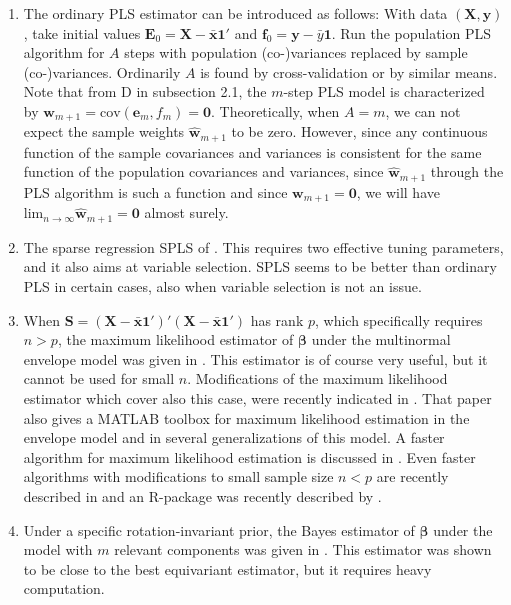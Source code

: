 \documentclass[num-refs]{wiley-article}
\begin{document}
\begin{enumerate}[label=\alph*.]

\item The ordinary PLS estimator can be introduced as follows: With data $(\bm{X},\bm{y})$, take initial values $\bm{E}_{0}=\bm{X}-\bar{\bm{x}}\bm{1}'$
  and $\bm{f}_{0}=\bm{y}-\bar{y}\bm{1}$. Run the population PLS algorithm for $A$ steps with population (co-)variances replaced by sample (co-)variances.
  Ordinarily $A$ is found by cross-validation or by similar means. Note that from D in subsection 2.1, the $m$-step PLS model is characterized by $\bm{w}_{m+1}=\mathrm{cov}(\bm{e}_m,f_m)=\bm{0}$. Theoretically, when $A=m$, we can not expect the sample weights $\widehat{\bm{w}}_{m+1}$
  to be zero. However, since any continuous function of the sample covariances and variances is consistent for the same function of the
  population covariances and variances, since  $\widehat{\bm{w}}_{m+1}$ through the PLS algorithm is such a function and since $\bm{w}_{m+1}=\bm{0}$, we will have ${\mathrm{lim}_{n\rightarrow\infty}}\widehat{\bm{w}}_{m+1}=\bm{0}$ almost surely.
  \smallskip

\item The sparse regression SPLS of \citet{chun2010sparse}. This requires two effective tuning parameters, and it also aims at variable selection. SPLS seems to be better than ordinary PLS in certain cases, also when variable selection is not an issue.
  \smallskip

\item When $\bm{S}=(\bm{X}-\bar{\bm{x}}\bm{1}')'(\bm{X}-\bar{\bm{x}}\bm{1}')$ has rank $p$, which specifically requires $n>p$, the maximum likelihood
  estimator of $\bm{\beta}$ under the multinormal envelope model was given in \citet{cook2013envelopes}. This estimator is of course very useful, but it cannot be used for small $n$. Modifications of the maximum likelihood estimator which cover also this case, were recently indicated in \citet{cook2015envlp}. That paper also gives a MATLAB toolbox for maximum likelihood estimation in the envelope model and in several generalizations of this model. A faster algorithm for maximum likelihood estimation is discussed in \citet{cook2016algorithms}. Even faster algorithms with modifications to small sample size $n<p$ are recently described in \citet{CookZhang2017} and an R-package was recently described by \citet{cook2016note}.
  \smallskip

\item Under a specific rotation-invariant prior, the Bayes estimator of $\bm{\beta}$ under the model with $m$ relevant components was given in \citet{helland2012near}. This estimator was shown to be close to the best equivariant estimator, but it requires heavy computation.
 

\end{enumerate}
\end{document}
